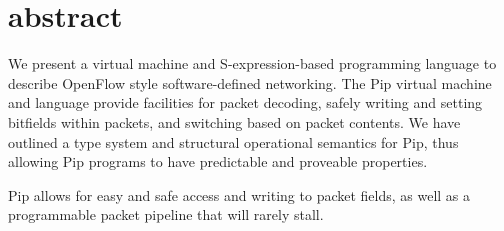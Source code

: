 
\section{abstract}
We present a virtual machine and S-expression-based programming language to describe OpenFlow style software-defined networking. The Pip virtual machine and language provide facilities for packet decoding, safely writing and setting bitfields within packets, and switching based on packet contents. We have outlined a type system and structural operational semantics for Pip, thus allowing Pip programs to have predictable and proveable properties.

Pip allows for easy and safe access and writing to packet fields, as well as a programmable packet pipeline that will rarely stall.
